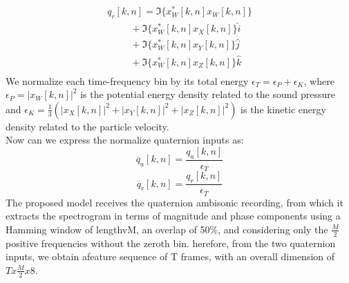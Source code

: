 \documentclass{article}
\begin{document}
    \begin{equation*}
        \begin{matrix}
            q_r[k,n]=\Im\{x_W^*[k,n]x_W[k,n]\} \\
            \hspace{1cm} + \Im\{x_W^*[k,n]x_X[k,n]\}\hat{i} \\
            \hspace{1cm} + \Im\{x_W^*[k,n]x_Y[k,n]\}\hat{j} \\
            \hspace{1cm} + \Im\{x_W^*[k,n]x_Z[k,n]\}\hat{k} \\
        \end{matrix}
    \end{equation*}
    We normalize each time-frequency bin by its total energy $\epsilon_T=\epsilon_P+\epsilon_K$, where $\epsilon_P=|x_W[k, n]|^2$ 
    is the potential energy density related to the sound pressure and $\epsilon_K=\frac{1}{3}(|x_X[k, n]|^2+|x_Y[k, n]|^2+|x_Z[k, n]|^2)$ 
    is the kinetic energy density related to the particle velocity.
    \\ Now can we express the normalize quaternion inputs as:
    \begin{equation*}
        \overline{q}_a [k,n] = \frac{q_a[k,n]}{\epsilon_T} 
    \end{equation*}
    \begin{equation*}
        \overline{q}_r [k,n] = \frac{q_r[k,n]}{\epsilon_T} 
    \end{equation*}
    The proposed model receives the quaternion ambisonic recording, from which it extracts the spectrogram in terms of magnitude and phase
    components using a Hamming window of lengthvM, an overlap of 50\%, and considering only the $\frac{M}{2}$ positive frequencies without the 
    zeroth bin. herefore, from the two quaternion inputs, we obtain afeature sequence of T frames, with an overall dimension of $Tx\frac{M}{2}x8$.
\end{document}
